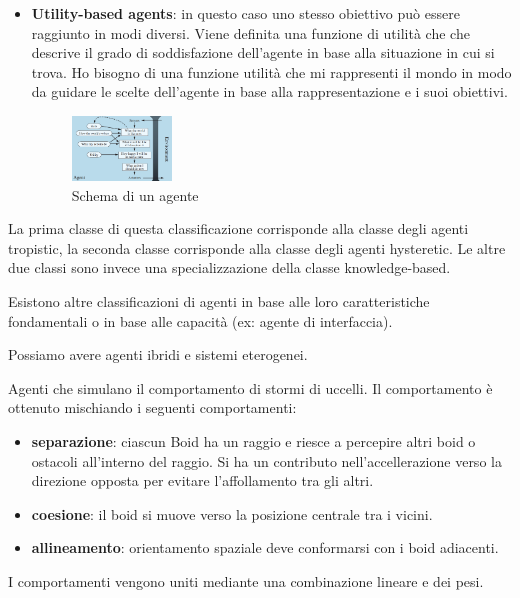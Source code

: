 \begin{itemize}
\begin{figure}[!ht]
              \label{fig:GoalBased}
          \end{figure}
    \item \textbf{Utility-based agents}: in questo caso uno stesso obiettivo può
          essere raggiunto in modi diversi. Viene definita una funzione di utilità che
          che descrive il grado di soddisfazione dell'agente in base alla situazione
          in cui si trova. Ho bisogno
          di una funzione utilità che mi rappresenti il mondo in modo da guidare 
          le scelte dell'agente in base alla rappresentazione e i suoi obiettivi.
          \begin{figure}[!ht]
              \centering
              \includegraphics[width=0.25\textwidth]{./img/Agenti/UtilityBasedAgent.png}
              \caption{Schema di un agente}
              \label{fig:UtilityBased}
          \end{figure}
\end{itemize}

La prima classe di questa classificazione corrisponde alla classe degli agenti
tropistic, la seconda classe corrisponde alla classe degli agenti hysteretic. Le
altre due classi sono invece una specializzazione della classe knowledge-based.

Esistono altre classificazioni di agenti in base alle loro caratteristiche fondamentali
o in base alle capacità (ex: agente di interfaccia).

Possiamo avere agenti ibridi e sistemi eterogenei.

\begin{esempio}
    Agenti che simulano il comportamento di stormi di uccelli. Il comportamento 
    è ottenuto mischiando i seguenti comportamenti:
    \begin{itemize}
        \item \textbf{separazione}: ciascun Boid ha un raggio e riesce a percepire 
        altri boid o ostacoli all'interno del raggio. Si ha un contributo nell'accellerazione
        verso la direzione opposta per evitare l'affollamento tra gli altri.
        \item \textbf{coesione}: il boid si muove verso la posizione centrale tra i vicini.
        \item \textbf{allineamento}: orientamento spaziale deve conformarsi con 
        i boid adiacenti.
    \end{itemize}
    I comportamenti vengono uniti mediante una combinazione lineare e dei pesi.
\end{esempio}

